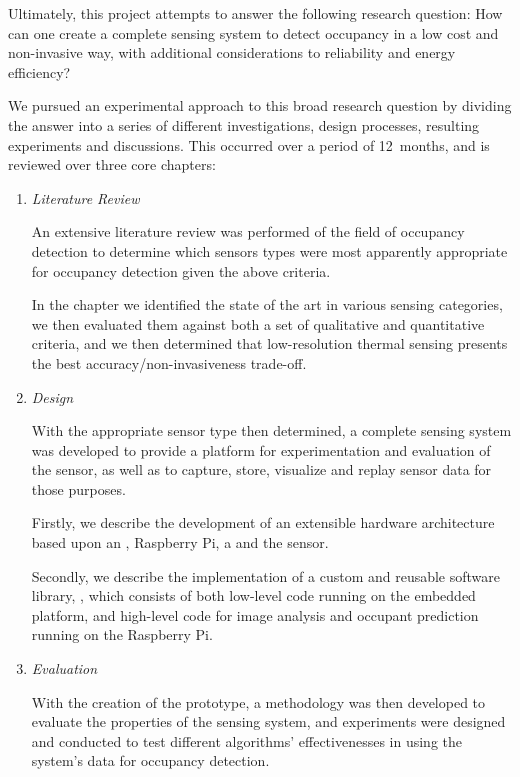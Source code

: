 \documentclass[../thesis/thesis.tex]{subfiles}
\begin{document}
Ultimately, this project attempts to answer the following research question: How can one create a complete sensing system to detect occupancy in a low cost and non-invasive way, with additional considerations to reliability and energy efficiency?

We pursued an experimental approach to this broad research question by dividing the answer into a series of different investigations, design processes, resulting experiments and discussions. This occurred over a period of 12~months, and is reviewed over three core chapters:

\begin{enumerate}
\item \emph{Literature Review}

An extensive literature review was performed of the field of occupancy detection to determine which sensors types were most apparently appropriate for occupancy detection given the above criteria. 

In the chapter we identified the state of the art in various sensing categories, we then evaluated them against both a set of qualitative and quantitative criteria, and we then determined that low-resolution thermal sensing presents the best accuracy/non-invasiveness trade-off.

\item \emph{Design}

With the appropriate sensor type then determined, a complete sensing system was developed to provide a platform for experimentation and evaluation of the sensor, as well as to capture, store, visualize and replay sensor data for those purposes.

Firstly, we describe the development of an extensible hardware architecture based upon an \ard, Raspberry Pi, a \pir and the \mlx sensor.

Secondly, we describe the implementation of a custom and reusable software library, \tarl, which consists of both low-level code running on the \ard embedded platform, and high-level code for image analysis and occupant prediction running on the Raspberry Pi.

\item \emph{Evaluation}

With the creation of the prototype, a methodology was then developed to evaluate the properties of the sensing system, and experiments were designed and conducted to test different algorithms' effectivenesses in using the system's data for occupancy detection.


\end{enumerate}
\end{document}
